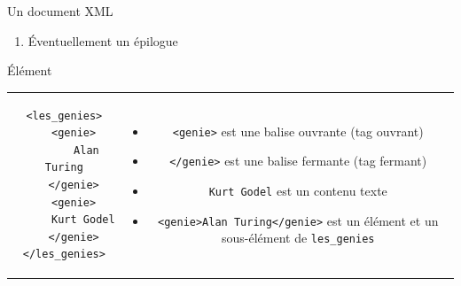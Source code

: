 \begin{frame}{Un document XML}
\begin{enumerate}
\begin{itemize}
\end{itemize}


\item \'Eventuellement un \'epilogue

\end{enumerate}

\end{frame}


\begin{frame}{\'El\'ement}
\lstset{numbers=left, numberstyle=\tiny, stepnumber=1}
\begin{tabular}{cc}
\begin{minipage}{0.3\textwidth}
\begin{lstlisting}
<les_genies>
   <genie>
       Alan Turing
   </genie>
   <genie>
      Kurt Godel
   </genie>
</les_genies>
\end{lstlisting}
\end{minipage}
&
\begin{minipage}{0.6\textwidth}
\begin{footnotesize}
 \begin{itemize}
\item \verb?<genie>? est une balise ouvrante (tag ouvrant) 

\item   \verb?</genie>? est une balise fermante (tag fermant) 

\item  \verb?Kurt Godel? est un contenu texte 

\item \verb?<genie>Alan Turing</genie>? est un \'el\'ement et un sous-\'el\'ement de \verb?les_genies?
 \end{itemize}
\end{footnotesize}
\end{minipage}
\end{tabular}

\framebreak


\end{frame}
